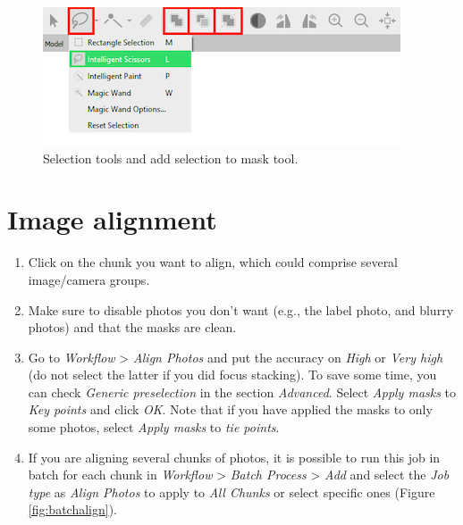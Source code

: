 \documentclass[
]{book}
\begin{document}
\begin{figure}

{\centering \includegraphics[width=0.6\linewidth]{Figures/tools_masks} 

}

\caption{Selection tools and add selection to mask tool.}\label{fig:toolsmasks}
\end{figure}

\hypertarget{image-alignment}{%
\section{Image alignment}\label{image-alignment}}

\begin{enumerate}
\def\labelenumi{\arabic{enumi}.}
\item
  Click on the chunk you want to align, which could comprise several
  image/camera groups.
\item
  Make sure to disable photos you don't want (e.g., the label photo, and
  blurry photos) and that the masks are clean.
\item
  Go to \emph{Workflow} \textgreater{} \emph{Align Photos} and put the accuracy on \emph{High} or
  \emph{Very high} (do not select the latter if you did focus stacking). To save some time,
  you can check \emph{Generic preselection} in the section \emph{Advanced}.
  Select \emph{Apply masks} to \emph{Key points} and click \emph{OK}. Note that if you
  have applied the masks to only some photos, select \emph{Apply masks} to \emph{tie points}.
\item
  If you are aligning several chunks of photos, it is possible to run
  this job in batch for each chunk in \emph{Workflow} \textgreater{} \emph{Batch Process} \textgreater{}
  \emph{Add} and select the \emph{Job type} as \emph{Align Photos} to apply to
  \emph{All Chunks} or select specific ones (Figure \ref{fig:batchalign}).
\end{enumerate}
\end{document}

